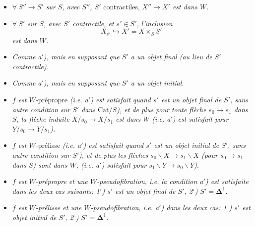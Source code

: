\documentclass[11pt]{article}
\newcommand{\printedpage}[1]{\marginpar{\footnotesize p.~#1}}
\begin{document}
\begin{itemize}[leftmargin=4em]
\item[\textit{a)}] \textit{$\forall\ S'' \longrightarrow S'$ sur $S$, avec $S''$, $S'$} contractiles, \textit{$X'' \longrightarrow X'$ est dans $W$.}

\item[\textit{a}$'$\textit{)}] \textit{$\forall\ S'$ sur $S$, avec $S'$ contractile, et $s' \in S'$, l'inclusion} %
\[ X_{s'} \hookrightarrow X' = X \times_S S' \]
\textit{est dans $W$.}

\item[\textit{a}$_1$\textit{)}] \textit{Comme a$'$), mais en supposant que $S'$ a un objet final (au lieu de $S'$ contractile).} %

\item[\textit{a}$_2$\textit{)}] \textit{Comme a$'$), mais en supposant que $S'$ a un objet initial.} %

\printedpage{37}

\item[\textit{b}$_1$\textit{)}] \textit{$f$ est $W$-}prépropre \textit{(i.e. a$'$) est satisfait quand $s'$ est un objet final de $S'$, sans autre condition sur $S'$ dans $\mathrm{Cat}/S$), et de plus pour toute flèche $s_0 \longrightarrow s_1$ dans $S$, la flèche induite $X/s_0 \longrightarrow X/s_1$ est dans $W$ (i.e. a$'$) est satisfait pour $Y/s_0 \longrightarrow Y/s_1$).}

\item[\textit{b}$_2$\textit{)}] \textit{$f$ est $W$-}prélisse \textit{(i.e. a$'$) est satisfait quand $s'$ est un objet initial de $S'$, sans autre condition sur $S'$), et de plus les flèches $s_0\backslash X \longrightarrow s_1\backslash X$ (pour $s_0 \longrightarrow s_1$ dans $S$) sont dans $W$, (i.e. a$'$) satisfait pour $s_1\backslash Y \longrightarrow s_0\backslash Y$).}

\item[\textit{c}$_1$\textit{)}] \textit{$f$ est $W$-prépropre et une $W$-pseudofibration, i.e. la condition a$'$) est satisfaite dans les deux cas suivants: 1$^\circ$) $s'$ est un objet final de $S'$, 2$^\circ$) $S' = \mathbf{\Delta}^1$.}

\item[\textit{c}$_2$\textit{)}] \textit{$f$ est $W$-prélisse et une $W$-pseudofibration, i.e. a$'$) dans les deux cas: 1$^\circ$) $s'$ est objet initial de $S'$, 2$^\circ$) $S' = \mathbf{\Delta}^1$.}
\end{itemize}
\end{document}
